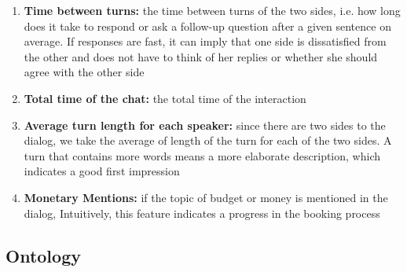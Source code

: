 \begin{enumerate}
\item {\bf Time between turns: } the time between 
turns of the two sides, i.e. how long does it take to respond or ask a follow-up 
question after a given sentence on average. 
If responses are fast, it can imply that one side is dissatisfied 
from the other and does not have to think of her replies or whether 
she should agree with the other side\label{itm:between}

\item {\bf Total time of the chat: } the total time of the interaction \label{itm:total}

\item {\bf Average turn length for each speaker: } since there are two sides to the dialog, 
we take the average of length of the turn for each of the two sides. 
A turn that contains more words means a more elaborate description, which indicates 
a good first impression\label{itm:sent}


\item {\bf Monetary Mentions: } if the topic of budget or money is mentioned in the dialog, 
Intuitively, this feature indicates a progress in the booking process\label{itm:budget}

\end{enumerate} 

\subsection{Ontology}
